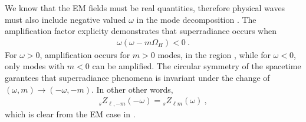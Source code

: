 We know that the EM fields must be real quantities, therefore physical waves must also include negative valued $\omega$ in the mode decomposition .
The amplification factor explicity demonstrates that superradiance occurs when
\begin{align}
    \label{eq3:superradiance}
    \omega(\omega-m\Omega_H)<0 ~.
\end{align}
For $\omega>0$, amplification occurs for $m>0$ modes, in the region , while for $\omega<0$, only modes with $m<0$ can be amplified.
The circular symmetry of the spacetime garantees that superradiance phenomena is invariant under the change of $(\omega,m)\to(-\omega,-m)$.
In other other words,
\begin{align}
    \label{eq3:ZcircularSymmetry}
    {}_{s}Z_{\ell,-m}(-\omega) = {}_{s}Z_{\ell m}(\omega) ~,
\end{align}
which is clear from the EM case in .


\cleardoublepage
